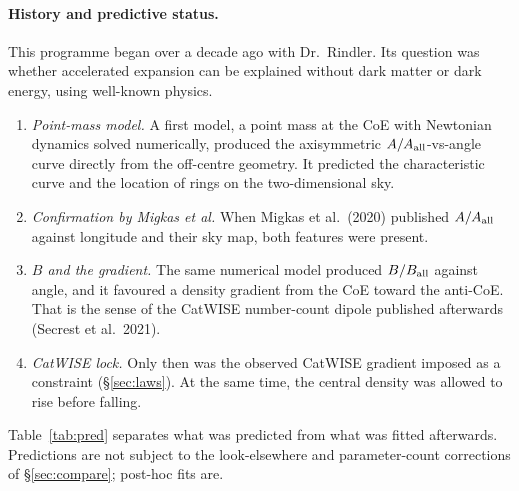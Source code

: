 \documentclass[11pt]{article}
\begin{document}
\paragraph{History and predictive status.} This programme began over a decade ago with Dr.\ Rindler. Its question was whether accelerated expansion can be explained without dark matter or dark energy, using well-known physics.
\begin{enumerate}
\item \emph{Point-mass model.} A first model, a point mass at the CoE with Newtonian dynamics solved numerically, produced the axisymmetric $A/A_{\rm all}$-vs-angle curve directly from the off-centre geometry. It predicted the characteristic curve and the location of rings on the two-dimensional sky.
\item \emph{Confirmation by Migkas et al.} When Migkas et al.\ (2020) published $A/A_{\rm all}$ against longitude and their sky map, both features were present.
\item \emph{$B$ and the gradient.} The same numerical model produced $B/B_{\rm all}$ against angle, and it favoured a density gradient from the CoE toward the anti-CoE. That is the sense of the CatWISE number-count dipole published afterwards (Secrest et al.\ 2021).
\item \emph{CatWISE lock.} Only then was the observed CatWISE gradient imposed as a constraint (\S\ref{sec:laws}). At the same time, the central density was allowed to rise before falling.
\end{enumerate}
Table~\ref{tab:pred} separates what was predicted from what was fitted afterwards. Predictions are not subject to the look-elsewhere and parameter-count corrections of \S\ref{sec:compare}; post-hoc fits are.
\end{document}
